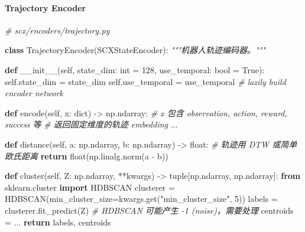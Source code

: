\documentclass[
  12pt,
]{ctexart}
\newenvironment{Shaded}{}{}
\newcommand{\BuiltInTok}[1]{\textcolor[rgb]{0.00,0.50,0.00}{#1}}
\newcommand{\CommentTok}[1]{\textcolor[rgb]{0.38,0.63,0.69}{\textit{#1}}}
\newcommand{\ControlFlowTok}[1]{\textcolor[rgb]{0.00,0.44,0.13}{\textbf{#1}}}
\newcommand{\DecValTok}[1]{\textcolor[rgb]{0.25,0.63,0.44}{#1}}
\newcommand{\FunctionTok}[1]{\textcolor[rgb]{0.02,0.16,0.49}{#1}}
\newcommand{\ImportTok}[1]{\textcolor[rgb]{0.00,0.50,0.00}{\textbf{#1}}}
\newcommand{\KeywordTok}[1]{\textcolor[rgb]{0.00,0.44,0.13}{\textbf{#1}}}
\newcommand{\NormalTok}[1]{#1}
\newcommand{\OperatorTok}[1]{\textcolor[rgb]{0.40,0.40,0.40}{#1}}
\newcommand{\StringTok}[1]{\textcolor[rgb]{0.25,0.44,0.63}{#1}}
\newcommand{\VariableTok}[1]{\textcolor[rgb]{0.10,0.09,0.49}{#1}}
\begin{document}
\paragraph{Trajectory Encoder}\label{trajectory-encoder}

\begin{Shaded}
\begin{Highlighting}[]
\CommentTok{\# scx/encoders/trajectory.py}

\KeywordTok{class}\NormalTok{ TrajectoryEncoder(SCXStateEncoder):}
    \CommentTok{"""机器人轨迹编码器。"""}

    \KeywordTok{def} \FunctionTok{\_\_init\_\_}\NormalTok{(}\VariableTok{self}\NormalTok{, state\_dim: }\BuiltInTok{int} \OperatorTok{=} \DecValTok{128}\NormalTok{, use\_temporal: }\BuiltInTok{bool} \OperatorTok{=} \VariableTok{True}\NormalTok{):}
        \VariableTok{self}\NormalTok{.state\_dim }\OperatorTok{=}\NormalTok{ state\_dim}
        \VariableTok{self}\NormalTok{.use\_temporal }\OperatorTok{=}\NormalTok{ use\_temporal}
        \CommentTok{\# lazily build encoder network}

    \KeywordTok{def}\NormalTok{ encode(}\VariableTok{self}\NormalTok{, x: }\BuiltInTok{dict}\NormalTok{) }\OperatorTok{{-}\textgreater{}}\NormalTok{ np.ndarray:}
        \CommentTok{\# x 包含 observation, action, reward, success 等}
        \CommentTok{\# 返回固定维度的轨迹 embedding}
\NormalTok{        ...}

    \KeywordTok{def}\NormalTok{ distance(}\VariableTok{self}\NormalTok{, a: np.ndarray, b: np.ndarray) }\OperatorTok{{-}\textgreater{}} \BuiltInTok{float}\NormalTok{:}
        \CommentTok{\# 轨迹用 DTW 或简单欧氏距离}
        \ControlFlowTok{return} \BuiltInTok{float}\NormalTok{(np.linalg.norm(a }\OperatorTok{{-}}\NormalTok{ b))}

    \KeywordTok{def}\NormalTok{ cluster(}\VariableTok{self}\NormalTok{, Z: np.ndarray, }\OperatorTok{**}\NormalTok{kwargs) }\OperatorTok{{-}\textgreater{}} \BuiltInTok{tuple}\NormalTok{[np.ndarray, np.ndarray]:}
        \ImportTok{from}\NormalTok{ sklearn.cluster }\ImportTok{import}\NormalTok{ HDBSCAN}
\NormalTok{        clusterer }\OperatorTok{=}\NormalTok{ HDBSCAN(min\_cluster\_size}\OperatorTok{=}\NormalTok{kwargs.get(}\StringTok{"min\_cluster\_size"}\NormalTok{, }\DecValTok{5}\NormalTok{))}
\NormalTok{        labels }\OperatorTok{=}\NormalTok{ clusterer.fit\_predict(Z)}
        \CommentTok{\# HDBSCAN 可能产生 {-}1 (noise)，需要处理}
\NormalTok{        centroids }\OperatorTok{=}\NormalTok{ ...}
        \ControlFlowTok{return}\NormalTok{ labels, centroids}
\end{Highlighting}
\end{Shaded}
\end{document}
